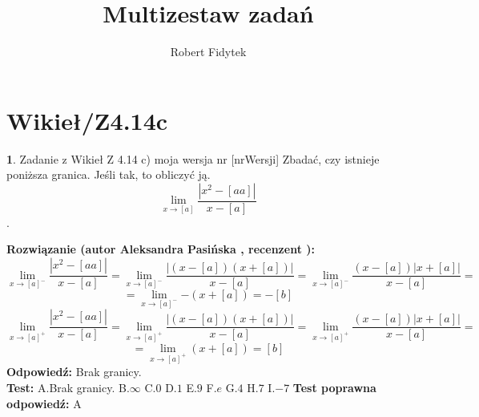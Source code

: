 \documentclass[12pt, a4paper]{article}
\title{Multizestaw zadań}
\author{Robert Fidytek}
\date{}
\theoremstyle{definition} %
\newtheorem{zad}{}
\newcommand{\kategoria}[1]{\section{#1}} %
\newcommand{\zadStart}[1]{\begin{zad}#1\newline} %
\newcommand{\zadStop}{\end{zad}}   %
\newcommand{\rozwStart}[2]{\noindent \textbf{Rozwiązanie (autor #1 , recenzent #2): }\newline} %
\newcommand{\rozwStop}{\newline}                                            %
\newcommand{\odpStart}{\noindent \textbf{Odpowiedź:}\newline}    %
\newcommand{\odpStop}{\newline}                                             %
\newcommand{\testStart}{\noindent \textbf{Test:}\newline} %
\newcommand{\testStop}{\newline} %
\newcommand{\kluczStart}{\noindent \textbf{Test poprawna odpowiedź:}\newline} %
\newcommand{\kluczStop}{\newline} %
\begin{document}
\maketitle


\kategoria{Wikieł/Z4.14c}
\zadStart{Zadanie z Wikieł Z 4.14 c) moja wersja nr [nrWersji]}
Zbadać, czy istnieje poniższa granica. Jeśli tak, to obliczyć ją. $$\lim_{x\rightarrow [a]}\frac{|x^2-[aa]|}{x-[a]}$$.
\zadStop
\rozwStart{Aleksandra Pasińska}{}
$$\lim_{x\rightarrow [a]^-}\frac{|x^2-[aa]|}{x-[a]}=\lim_{x\rightarrow [a]^-}\frac{|(x-[a])(x+[a])|}{x-[a]}=\lim_{x\rightarrow [a]^-}\frac{(x-[a])|x+[a]|}{x-[a]}=$$
$$=\lim_{x\rightarrow [a]^-}{-(x+[a])}=-[b]$$
$$\lim_{x\rightarrow [a]^+}\frac{|x^2-[aa]|}{x-[a]}=\lim_{x\rightarrow [a]^+}\frac{|(x-[a])(x+[a])|}{x-[a]}=\lim_{x\rightarrow [a]^+}\frac{(x-[a])|x+[a]|}{x-[a]}=$$
$$=\lim_{x\rightarrow [a]^+}{(x+[a])}=[b]$$
\rozwStop
\odpStart
Brak granicy.\\
\odpStop
\testStart
A.Brak granicy.
B.$\infty$
C.$0$
D.$1$
E.$9$
F.$e$
G.$4$
H.$7$
I.$-7$
\testStop
\kluczStart
A
\kluczStop
\end{document}
